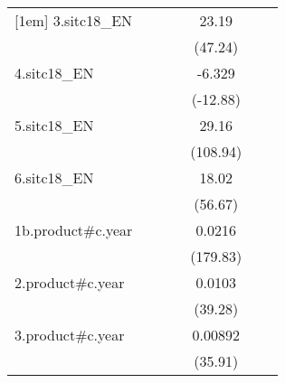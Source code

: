 {\begin{tabular}{l*{6}{c}}
[1em]
3.sitc18\_EN         &                     &                     &                     &       23.19\sym{***}&                     &                     \\
                    &                     &                     &                     &     (47.24)         &                     &                     \\
[1em]
4.sitc18\_EN         &                     &                     &                     &      -6.329\sym{***}&                     &                     \\
                    &                     &                     &                     &    (-12.88)         &                     &                     \\
[1em]
5.sitc18\_EN         &                     &                     &                     &       29.16\sym{***}&                     &                     \\
                    &                     &                     &                     &    (108.94)         &                     &                     \\
[1em]
6.sitc18\_EN         &                     &                     &                     &       18.02\sym{***}&                     &                     \\
                    &                     &                     &                     &     (56.67)         &                     &                     \\
[1em]
1b.product#c.year   &                     &                     &                     &      0.0216\sym{***}&                     &                     \\
                    &                     &                     &                     &    (179.83)         &                     &                     \\
[1em]
2.product#c.year    &                     &                     &                     &      0.0103\sym{***}&                     &                     \\
                    &                     &                     &                     &     (39.28)         &                     &                     \\
[1em]
3.product#c.year    &                     &                     &                     &     0.00892\sym{***}&                     &                     \\
                    &                     &                     &                     &     (35.91)         &                     &                     \\

\end{tabular}}
